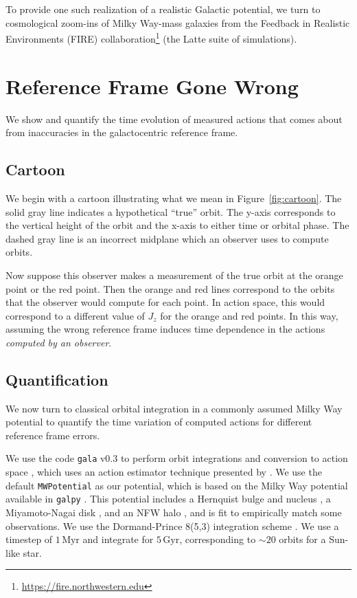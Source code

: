 \documentclass[twocolumn]{aastex62}
\newcommand{\Myr}{\text{Myr}}
\newcommand{\Gyr}{\text{Gyr}}
\begin{document}
To provide one such realization of a realistic Galactic potential, we turn to
cosmological zoom-ins of Milky Way-mass galaxies from the Feedback in
Realistic Environments (FIRE)
collaboration\footnote{\url{https://fire.northwestern.edu}} (the Latte suite
of simulations).

\section{Reference Frame Gone Wrong} \label{sec:ref_frame}
We show and quantify the time evolution of measured actions that comes about
from inaccuracies in the galactocentric reference frame.

\subsection{Cartoon} \label{ssec:cartoon}
We begin with a cartoon illustrating what we mean in Figure~\ref{fig:cartoon}.
The solid gray line indicates a hypothetical ``true'' orbit. The y-axis
corresponds to the vertical height of the orbit and the x-axis to either time
or orbital phase. The dashed gray line is an incorrect midplane which an
observer uses to compute orbits.

Now suppose this observer makes a measurement of the true orbit at the orange
point or the red point. Then the orange and red lines correspond to the orbits
that the observer would compute for each point. In action space, this would
correspond to a different value of $J_z$ for the orange and red points. In
this way, assuming the wrong reference frame induces time dependence in the
actions {\em computed by an observer}.

\begin{figure*}
\caption{Caption.}
\label{fig:cartoon}
\end{figure*}

\subsection{Quantification} \label{ssec:quant}
We now turn to classical orbital integration in a commonly assumed Milky Way
potential to quantify the time variation of computed actions for different
reference frame errors.

We use the code \texttt{gala} v0.3 to perform orbit integrations and
conversion to action space \citep{2017JOSS....2..388P,Price-Whelan:2018},
which uses an action estimator technique presented by
\citet{2014MNRAS.441.3284S}. We use the default \texttt{MWPotential} as our
potential, which is based on the Milky Way potential available in
\texttt{galpy} \citep{2015ApJS..216...29B}. This potential includes a
Hernquist bulge and nucleus \citep{1990ApJ...356..359H}, a Miyamoto-Nagai disk
\citep{1975PASJ...27..533M}, and an NFW halo \citep{1997ApJ...490..493N}, and
is fit to empirically match some observations. We use the Dormand-Prince
8(5,3) integration scheme \citep{Dormand80:integrator}. We use a timestep of
$1\,\Myr$ and integrate for $5\,\Gyr$, corresponding to $\sim 20$ orbits for
a Sun-like star.
\end{document}
